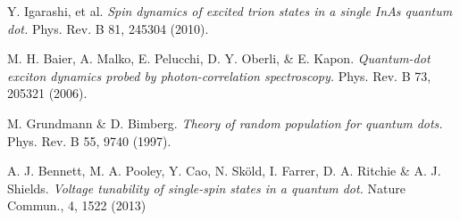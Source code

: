 \documentclass[12pt, twoside]{article}
\numberwithin{equation}{section}
\begin{document}
\begin{thebibliography}{99}
  Y. Igarashi, et al.
  \emph{Spin dynamics of excited trion states in a single InAs quantum dot.}
  Phys. Rev. B 
  81, 
  245304 (2010).

  M. H. Baier, A. Malko, E. Pelucchi, D. Y. Oberli, \& E. Kapon. 
  \emph{Quantum-dot exciton dynamics probed by photon-correlation spectroscopy.}
  Phys. Rev. B 
  73, 
  205321 (2006).

  M. Grundmann \& D. Bimberg. 
  \emph{Theory of random population for quantum dots.}
  Phys. Rev. B 
  55, 
  9740 (1997).

  A. J. Bennett, M. A. Pooley, Y. Cao, N. Sköld, I. Farrer, D. A. Ritchie \& A. J. Shields.
  \emph{Voltage tunability of single-spin states in a quantum dot.}
  Nature Commun., 
  4, 
  1522 (2013)

\end{thebibliography}
\end{document}
